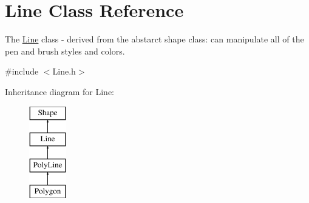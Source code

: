 \hypertarget{class_line}{}\section{Line Class Reference}
\label{class_line}


The \hyperlink{class_line}{Line} class -\/ derived from the abstarct shape class\+: can manipulate all of the pen and brush styles and colors.  




{\ttfamily \#include $<$Line.\+h$>$}

Inheritance diagram for Line\+:\begin{figure}[H]
\begin{center}
\leavevmode
\includegraphics[height=4.000000cm]{class_line}
\end{center}
\end{figure}
